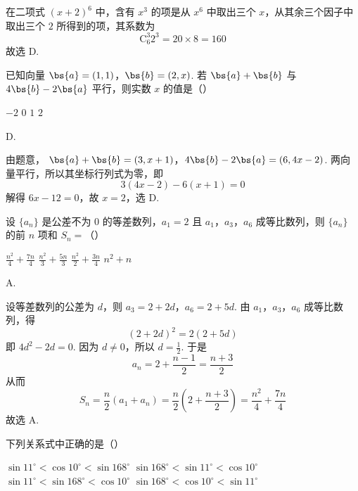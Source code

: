 \begin{solution}
在二项式 \((x+2)^6\) 中，含有 \(x^3\) 的项是从 \(x^6\) 中取出三个 \(x\)，从其余三个因子中取出三个 \(2\) 所得到的项，其系数为
\[
\mathrm C_6^3 2^3=20\times 8=160
\]
故选 D.
\end{solution}

\begin{problem}
已知向量 \(\bs{a}=(1,1)\)，\(\bs{b}=(2,x)\). 若 \(\bs{a}+\bs{b}\) 与 \(4\bs{b}-2\bs{a}\) 平行，则实数 \(x\) 的值是（\quad）

\choices
    {\(-2\)}
    {\(0\)}
    {\(1\)}
    {\(2\)}
\end{problem}

\begin{answer}
D.
\end{answer}

\begin{solution}
由题意，
\(\bs{a}+\bs{b}=(3,x+1)\)，\(4\bs{b}-2\bs{a}=(6,4x-2)\).
两向量平行，所以其坐标行列式为零，即
\[
3(4x-2)-6(x+1)=0
\]
解得 \(6x-12=0\)，故 \(x=2\)，选 D.
\end{solution}

\begin{problem}
设 \(\{a_{n}\}\) 是公差不为 \(0\) 的等差数列，\(a_{1} = 2\) 且 \(a_{1}\)，\(a_{3}\)，\(a_{6}\) 成等比数列，则 \(\{a_{n}\}\) 的前 \(n\) 项和 \(S_{n} =\)（\quad）

\choices
    {\(\frac{n^2}{4} +\frac{7n}{4}\)}
    {\(\frac{n^2}{3} +\frac{5n}{3}\)}
    {\(\frac{n^2}{2} +\frac{3n}{4}\)}
    {\(n^2 + n\)}
\end{problem}

\begin{answer}
A.
\end{answer}

\begin{solution}
设等差数列的公差为 \(d\)，则
\(a_3=2+2d\)，\(a_6=2+5d\).
由 \(a_1\)，\(a_3\)，\(a_6\) 成等比数列，得
\[
(2+2d)^2=2(2+5d)
\]
即 \(4d^2-2d=0\). 因为 \(d\ne 0\)，所以 \(d=\frac12\). 于是
\[
a_n=2+\frac{n-1}{2}=\frac{n+3}{2}
\]
从而
\[
S_n=\frac n2(a_1+a_n)=\frac n2\left(2+\frac{n+3}{2}\right)=\frac{n^2}{4}+\frac{7n}{4}
\]
故选 A.
\end{solution}

\begin{problem}
下列关系式中正确的是（\quad）

\choices
    {\(\sin 11^{\circ} < \cos 10^{\circ} < \sin 168^{\circ}\)}
    {\(\sin 168^{\circ} < \sin 11^{\circ} < \cos 10^{\circ}\)}
    {\(\sin 11^{\circ} < \sin 168^{\circ} < \cos 10^{\circ}\)}
    {\(\sin 168^{\circ} < \cos 10^{\circ} < \sin 11^{\circ}\)}
\end{problem}

